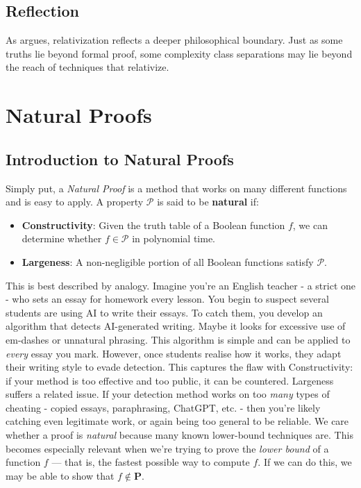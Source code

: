 \documentclass[12pt]{report}
\begin{document}
\section{Reflection}
As \cite{aaronson2005philosophers} argues, relativization reflects a deeper philosophical boundary.
Just as some truths lie beyond formal proof, some complexity class separations may lie beyond the reach of techniques that relativize.

\newpage
\chapter{Natural Proofs}
\section{Introduction to Natural Proofs}
Simply put, a \textit{Natural Proof} is a method that works on many different functions and is easy to apply.  
A property $\mathcal{P}$ is said to be \textbf{natural} if:
\begin{itemize}
    \item \textbf{Constructivity}: Given the truth table of a Boolean function $f$, we can determine whether $f \in \mathcal{P}$ in polynomial time.
    \item \textbf{Largeness}: A non-negligible portion of all Boolean functions satisfy $\mathcal{P}$.
\end{itemize}
This is best described by analogy.  
Imagine you're an English teacher - a strict one - who sets an essay for homework every lesson. You begin to suspect several students are using AI to write their essays.  
To catch them, you develop an algorithm that detects AI-generated writing. Maybe it looks for excessive use of em-dashes or unnatural phrasing.
This algorithm is simple and can be applied to \textit{every} essay you mark.  
However, once students realise how it works, they adapt their writing style to evade detection.  
This captures the flaw with Constructivity: if your method is too effective and too public, it can be countered.
Largeness suffers a related issue. If your detection method works on too \textit{many} types of cheating - copied essays, paraphrasing, ChatGPT, etc. - then you're likely catching even legitimate work, or again being too general to be reliable.
\vspace{1cm}
\newline
We care whether a proof is \textit{natural} because many known lower-bound techniques are.  
This becomes especially relevant when we're trying to prove the \textit{lower bound} of a function $f$ — that is, the fastest possible way to compute $f$.  
If we can do this, we may be able to show that $f \notin \mathbf{P}$.
\end{document}
